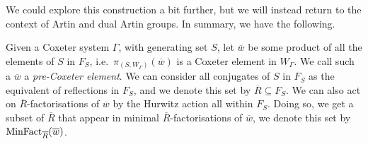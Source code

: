 %
%
%
We could explore this construction a bit further, but we will instead return to the context of Artin and dual Artin groups.
In summary, we have the following.


Given a Coxeter system $\Gamma$, with generating set $S$, let $\overline{w}$ be some product of  all the elements of $S$ in  $F_S$, i.e.~$\pi_{(S,W_\Gamma)}(\overline{w})$ is a Coxeter element in $W_\Gamma$.
We call such a $\overline{w}$ a \emph{pre-Coxeter element}.
We can consider all conjugates of  $S$ in $F_S$ as the equivalent of reflections in $F_S$, and we denote this set by  $\overline{R} \subseteq F_S$.
We can also act on $\overline{R}$-factorisations of $\overline{w}$ by the Hurwitz action all within $F_S$.
Doing so, we get a subset of $\overline{R}$ that appear in minimal $\overline{R}$-factorisations of $\overline{w}$, we denote this set by $\operatorname{MinFact}_{\overline{R}}(\overline{w})$.

